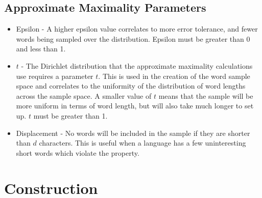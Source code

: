 \documentclass{article}
\begin{document}
\subsection{Approximate Maximality Parameters}
\begin{itemize}
\item Epsilon - A higher epsilon value correlates to more error tolerance, and fewer words being sampled over the distribution. Epsilon must be greater than 0 and less than 1.
\item $t$ - The Dirichlet distribution that the approximate maximality calculations use requires a parameter $t$. 
This is used in the creation of the word sample space and correlates to the uniformity of the distribution of word lengths across the sample space. A smaller value of $t$ means that the sample will be more uniform in terms of word length, but will also take much longer to set up. 
$t$ must be greater than 1.
\item Displacement - No words will be included in the sample if they are shorter than $d$ characters.
This is useful when a language has a few uninteresting short words which violate the property.
\end{itemize}

\section{Construction}
\end{document}
